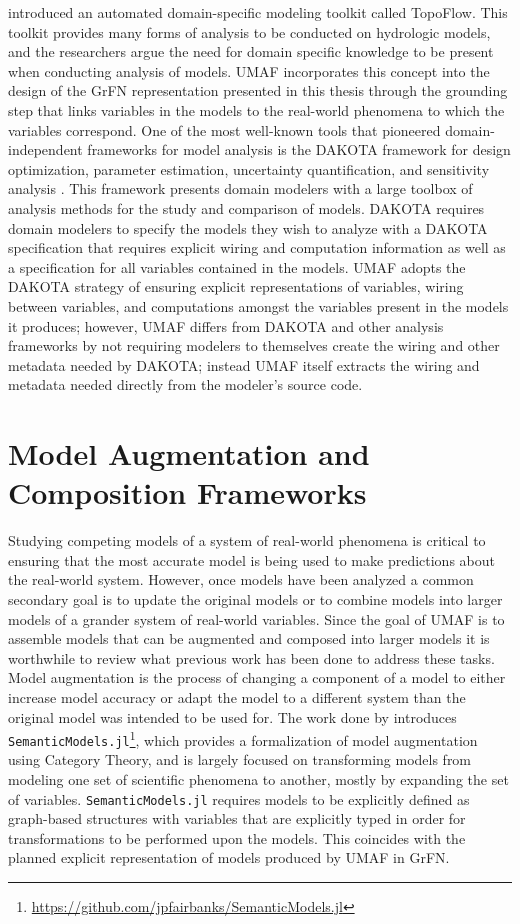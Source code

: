 \citet{peckham2017reproducible} introduced an automated domain-specific modeling toolkit called TopoFlow.
This toolkit provides many forms of analysis to be conducted on hydrologic models, and the researchers argue the need for domain specific knowledge to be present when conducting analysis of models.
UMAF incorporates this concept into the design of the GrFN representation presented in this thesis through the grounding step that links variables in the models to the real-world phenomena to which the variables correspond.
One of the most well-known tools that pioneered domain-independent frameworks for model analysis is the DAKOTA framework for design optimization, parameter estimation, uncertainty quantification, and sensitivity analysis \citep{adams2009dakota}.
This framework presents domain modelers with a large toolbox of analysis methods for the study and comparison of models.
DAKOTA requires domain modelers to specify the models they wish to analyze with a DAKOTA specification that requires explicit wiring and computation information as well as a specification for all variables contained in the models.
UMAF adopts the DAKOTA strategy of ensuring explicit representations of variables, wiring between variables, and computations amongst the variables present in the models it produces; however, UMAF differs from DAKOTA and other analysis frameworks by not requiring modelers to themselves create the wiring and other metadata needed by DAKOTA; instead UMAF itself extracts the wiring and metadata needed directly from the modeler's source code.

\section{Model Augmentation and Composition Frameworks \label{sec:rwork_composition}}
Studying competing models of a system of real-world phenomena is critical to ensuring that the most accurate model is being used to make predictions about the real-world system.
However, once models have been analyzed a common secondary goal is to update the original models or to combine models into larger models of a grander system of real-world variables.
Since the goal of UMAF is to assemble models that can be augmented and composed into larger models it is worthwhile to review what previous work has been done to address these tasks.
Model augmentation is the process of changing a component of a model to either increase model accuracy or adapt the model to a different system than the original model was intended to be used for.
The work done by \citet{semanticModels2019} introduces \texttt{SemanticModels.jl}\footnote{\url{https://github.com/jpfairbanks/SemanticModels.jl}}, which provides a formalization of model augmentation using Category Theory, and is largely focused on transforming models from modeling one set of scientific phenomena to another, mostly by expanding the set of variables.
\texttt{SemanticModels.jl} requires models to be explicitly defined as graph-based structures with variables that are explicitly typed in order for transformations to be performed upon the models.
This coincides with the planned explicit representation of models produced by UMAF in GrFN.


